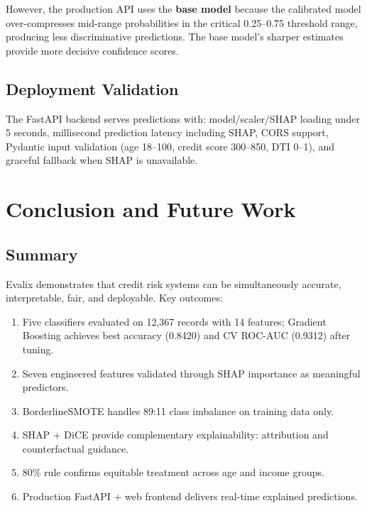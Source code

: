 \documentclass[12pt]{report}
\begin{document}
However, the production API uses the \textbf{base model} because the calibrated model over-compresses mid-range probabilities in the critical 0.25--0.75 threshold range, producing less discriminative predictions. The base model's sharper estimates provide more decisive confidence scores.


\section{Deployment Validation}

The FastAPI backend serves predictions with: model/scaler/SHAP loading under 5 seconds, millisecond prediction latency including SHAP, CORS support, Pydantic input validation (age 18--100, credit score 300--850, DTI 0--1), and graceful fallback when SHAP is unavailable.



\chapter{Conclusion and Future Work}

\section{Summary}

Evalix demonstrates that credit risk systems can be simultaneously accurate, interpretable, fair, and deployable. Key outcomes:

\begin{enumerate}[nosep]
    \item Five classifiers evaluated on 12,367 records with 14 features; Gradient Boosting achieves best accuracy (0.8420) and CV ROC-AUC (0.9312) after tuning.
    \item Seven engineered features validated through SHAP importance as meaningful predictors.
    \item BorderlineSMOTE handles 89:11 class imbalance on training data only.
    \item SHAP + DiCE provide complementary explainability: attribution and counterfactual guidance.
    \item 80\% rule confirms equitable treatment across age and income groups.
    \item Production FastAPI + web frontend delivers real-time explained predictions.
\end{enumerate}
\end{document}
